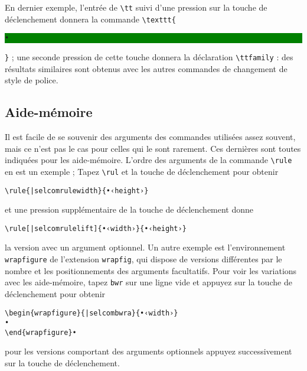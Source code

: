 \documentclass[11pt,french]{article}
\newcommand{\selmark}{\colorbox{green}{\rule[-0.5ex]{0ex}{2.1ex}\texttt{•}}}
\begin{document}
En dernier exemple, l'entrée de \verb|\tt| suivi d'une pression sur la touche de déclenchement donnera la commande \verb|\texttt{|\selmark\verb|}| ; une seconde pression de cette touche donnera la déclaration \verb|\ttfamily| : des résultats similaires sont obtenus avec les autres commandes de changement de style de police.


\subsection*{Aide-mémoire}

Il est facile de se souvenir des arguments des commandes utilisées assez souvent, mais ce n'est pas le cas pour 
celles qui le sont rarement. Ces dernières sont toutes indiquées pour les aide-mémoire. L'ordre des arguments de la 
commande \verb|\rule| en est un exemple ; Tapez \verb|\rul| et la touche de déclenchement pour obtenir

\begin{verbatim}
\rule{|selcomrulewidth}{•‹height›}
\end{verbatim}
et une pression supplémentaire de la touche de déclenchement donne
\begin{verbatim}
\rule[|selcomrulelift]{•‹width›}{•‹height›}
\end{verbatim}
la version avec un argument optionnel. Un autre exemple est l'environnement \texttt{wrapfigure} de l'extension \texttt{wrapfig}, qui dispose de versions différentes par le nombre et les positionnements des arguments facultatifs. Pour voir les variations avec les aide-mémoire, tapez \texttt{bwr} sur une ligne vide et appuyez sur la touche de déclenchement pour obtenir 
\begin{verbatim}
\begin{wrapfigure}{|selcombwra}{•‹width›}
•
\end{wrapfigure}•
\end{verbatim}
pour les versions comportant des arguments optionnels appuyez successivement sur la touche de déclenchement.
\end{document}
